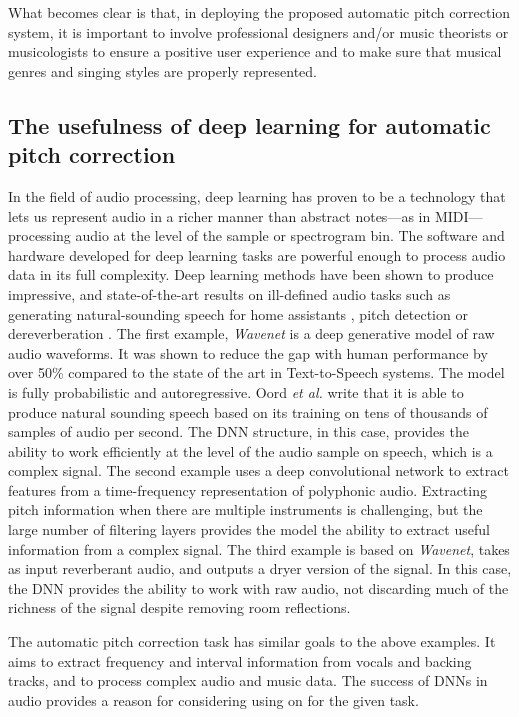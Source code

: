 What becomes clear is that, in deploying the proposed automatic pitch correction system, it is important to involve professional designers and/or music theorists or musicologists to ensure a positive user experience and to make sure that musical genres and singing styles are properly represented.

\subsection{The usefulness of deep learning for automatic pitch correction}
In the field of audio processing, deep learning has proven to be a technology that lets us represent audio in a richer manner than abstract notes---as in MIDI---processing audio at the level of the sample or spectrogram bin. The software and hardware developed for deep learning tasks are powerful enough to process audio data in its full complexity. Deep learning methods have been shown to produce impressive, and state-of-the-art results on ill-defined audio tasks such as generating natural-sounding speech for home assistants \cite{oord2016wavenet}, pitch detection \cite{bittner2017deep} or dereverberation \cite{su2020hifi}. The first example, \textit{Wavenet} is a deep generative model of raw audio waveforms. It was shown to reduce the gap with human performance by over 50\% compared to the state of the art in Text-to-Speech systems. The model is fully probabilistic and autoregressive. Oord \textit{et al.} write that it is able to produce natural sounding speech based on its training on tens of thousands of samples of audio per second. The DNN structure, in this case, provides the ability to work efficiently at the level of the audio sample on speech, which is a complex signal. The second example uses a deep convolutional network to extract features from a time-frequency representation of polyphonic audio. Extracting pitch information when there are multiple instruments is challenging, but the large number of filtering layers provides the model the ability to extract useful information from a complex signal. The third example is based on \textit{Wavenet}, takes as input reverberant audio, and outputs a dryer version of the signal. In this case, the DNN provides the ability to work with raw audio, not discarding much of the richness of the signal despite removing room reflections.

The automatic pitch correction task has similar goals to the above examples. It aims to extract frequency and interval information from vocals and backing tracks, and to process complex audio and music data. The success of DNNs in audio provides a reason for considering using on for the given task.